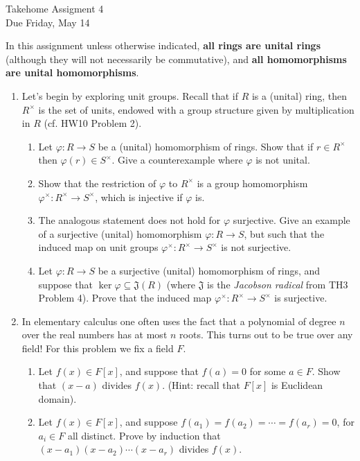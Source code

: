 \documentclass[11pt]{article}
\newcommand{\fJ}{\mathfrak{J}}
\begin{document}
\begin{center}
  \Large {Takehome Assigment 4}\\
  \small {Due Friday, May 14}
\end{center}
In this assignment unless otherwise indicated, \textbf{all rings are unital rings} (although they will not necessarily be commutative), and \textbf{all homomorphisms are unital homomorphisms}.
\begin{enumerate}
  \item{
  Let's begin by exploring unit groups. Recall that if $R$ is a (unital) ring, then $R^\times$ is the set of units, endowed with a group structure given by multiplication in $R$ (cf. HW10 Problem 2).
  \begin{enumerate}
    \item{
    Let $\varphi:R\to S$ be a (unital) homomorphism of rings.  Show that if $r\in R^\times$ then $\varphi(r)\in S^\times$.  Give a counterexample where $\varphi$ is not unital.
    }
    \item{
    Show that the restriction of $\varphi$ to $R^\times$ is a group homomorphism $\varphi^\times: R^\times\to S^\times$, which is injective if $\varphi$ is.
    }
    \item{
    The analogous statement does not hold for $\varphi$ surjective.  Give an example of a surjective (unital) homomorphism $\varphi:R\to S$, but such that the induced map on unit groups $\varphi^\times:R^\times\to S^\times$ is not surjective.
    }
    \item{
    Let $\varphi:R\to S$ be a surjective (unital) homomorphism of rings, and suppose that $\ker\varphi\subseteq\fJ(R)$ (where $\fJ$ is the \textit{Jacobson radical} from TH3 Problem 4).  Prove that the induced map $\varphi^\times:R^\times\to S^\times$ is surjective.
    }
  \end{enumerate}
  }
  \item{
  In elementary calculus one often uses the fact that a polynomial of degree $n$ over the real numbers has at most $n$ roots.  This turns out to be true over any field!  For this problem we fix a field $F$.
  \begin{enumerate}
    \item{
    Let $f(x)\in F[x]$, and suppose that $f(a)=0$ for some $a\in F$.  Show that $(x-a)$ divides $f(x)$.  (Hint: recall that $F[x]$ is Euclidean domain).
    }
    \item{
    Let $f(x)\in F[x]$, and suppose $f(a_1)=f(a_2)=\cdots=f(a_r)=0$, for $a_i\in F$ all distinct.  Prove by induction that $(x-a_1)(x-a_2)\cdots(x-a_r)$ divides $f(x)$.
}
\end{enumerate}}
\end{enumerate}
\end{document}
